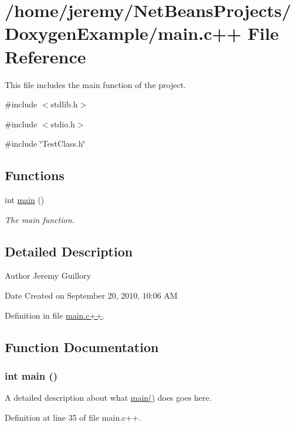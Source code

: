 \hypertarget{main_8c_09_09}{
\section{/home/jeremy/NetBeansProjects/DoxygenExample/main.c++ File Reference}
\label{main_8c_09_09}
}


This file includes the main function of the project.  


{\ttfamily \#include $<$stdlib.h$>$}\par
{\ttfamily \#include $<$stdio.h$>$}\par
{\ttfamily \#include \char`\"{}TestClass.h\char`\"{}}\par
\subsection*{Functions}
\begin{DoxyCompactItemize}
\item 
int \hyperlink{main_8c_09_09_ae66f6b31b5ad750f1fe042a706a4e3d4}{main} ()
\begin{DoxyCompactList}\small\item\em The main function. \item\end{DoxyCompactList}\end{DoxyCompactItemize}


\subsection{Detailed Description}
\begin{DoxyAuthor}{Author}
Jeremy Guillory
\end{DoxyAuthor}
\begin{DoxyDate}{Date}
Created on September 20, 2010, 10:06 AM 
\end{DoxyDate}


Definition in file \hyperlink{main_8c_09_09_source}{main.c++}.



\subsection{Function Documentation}
\hypertarget{main_8c_09_09_ae66f6b31b5ad750f1fe042a706a4e3d4}{
\subsubsection[{main}]{\setlength{\rightskip}{0pt plus 5cm}int main ()}}
\label{main_8c_09_09_ae66f6b31b5ad750f1fe042a706a4e3d4}
A detailed description about what \hyperlink{main_8c_09_09_ae66f6b31b5ad750f1fe042a706a4e3d4}{main()} does goes here. 

Definition at line 35 of file main.c++.

